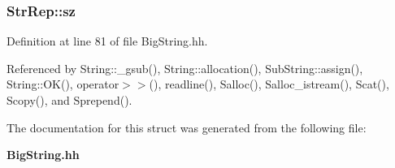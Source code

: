 \subsubsection{ Str\-Rep::sz}\label{structStrRep_m1}




Definition at line 81 of file Big\-String.hh.

Referenced by String::\_\-gsub(), String::allocation(), Sub\-String::assign(), String::OK(), operator$>$$>$(), readline(), Salloc(), Salloc\_\-istream(), Scat(), Scopy(), and Sprepend().

The documentation for this struct was generated from the following file:\begin{CompactItemize}
\item 
{\bf Big\-String.hh}\end{CompactItemize}
